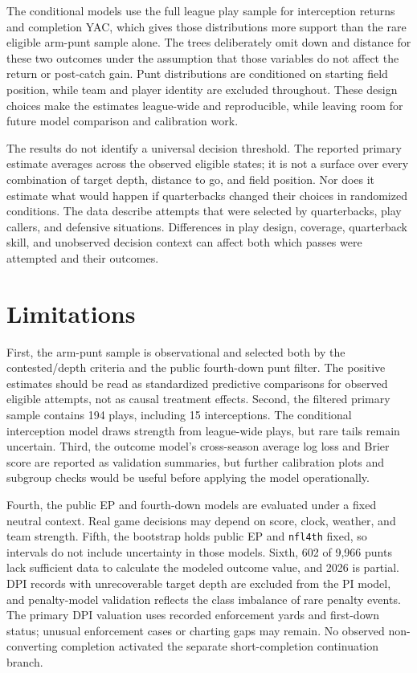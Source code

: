 \documentclass[11pt]{article}
\begin{document}
The conditional models use the full league play sample for interception returns and completion YAC, which gives those distributions more support than the rare eligible arm-punt sample alone. The trees deliberately omit down and distance for these two outcomes under the assumption that those variables do not affect the return or post-catch gain. Punt distributions are conditioned on starting field position, while team and player identity are excluded throughout. These design choices make the estimates league-wide and reproducible, while leaving room for future model comparison and calibration work.

The results do not identify a universal decision threshold. The reported primary estimate averages across the observed eligible states; it is not a surface over every combination of target depth, distance to go, and field position. Nor does it estimate what would happen if quarterbacks changed their choices in randomized conditions. The data describe attempts that were selected by quarterbacks, play callers, and defensive situations. Differences in play design, coverage, quarterback skill, and unobserved decision context can affect both which passes were attempted and their outcomes.

\section{Limitations}

First, the arm-punt sample is observational and selected both by the contested/depth criteria and the public fourth-down punt filter. The positive estimates should be read as standardized predictive comparisons for observed eligible attempts, not as causal treatment effects. Second, the filtered primary sample contains 194 plays, including 15 interceptions. The conditional interception model draws strength from league-wide plays, but rare tails remain uncertain. Third, the outcome model's cross-season average log loss and Brier score are reported as validation summaries, but further calibration plots and subgroup checks would be useful before applying the model operationally.

Fourth, the public EP and fourth-down models are evaluated under a fixed neutral context. Real game decisions may depend on score, clock, weather, and team strength. Fifth, the bootstrap holds public EP and \texttt{nfl4th} fixed, so intervals do not include uncertainty in those models. Sixth, 602 of 9,966 punts lack sufficient data to calculate the modeled outcome value, and 2026 is partial. DPI records with unrecoverable target depth are excluded from the PI model, and penalty-model validation reflects the class imbalance of rare penalty events. The primary DPI valuation uses recorded enforcement yards and first-down status; unusual enforcement cases or charting gaps may remain. No observed non-converting completion activated the separate short-completion continuation branch.
\end{document}
